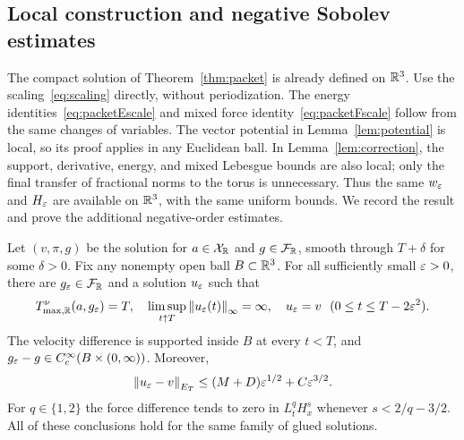 \subsection{Local construction and negative Sobolev estimates}
The compact solution of Theorem~\ref{thm:packet} is already defined on
$\mathbb R^3$. Use the scaling~\eqref{eq:scaling} directly, without
periodization. The energy identities~\eqref{eq:packetEscale} and mixed
force identity~\eqref{eq:packetFscale} follow from the same changes of
variables. The vector potential in Lemma~\ref{lem:potential} is local,
so its proof applies in any Euclidean ball. In
Lemma~\ref{lem:correction}, the support, derivative, energy, and mixed
Lebesgue bounds are also local; only the final transfer of fractional
norms to the torus is unnecessary. Thus the same $w_\varepsilon$ and $H_\varepsilon$
are available on $\mathbb R^3$, with the same uniform bounds. We record the
result and prove the additional negative-order estimates.
\begin{theorem}\label{thm:Rinsert}
Let $(v,\pi,g)$ be the solution for $a\in\mathcal X_{\mathbb R}$ and $g\in\mathcal F_{\mathbb R}$, smooth through $T+\delta$ for some $\delta>0$. Fix any nonempty open ball $B\subset\mathbb R^3$. For all sufficiently small $\varepsilon>0$, there are $g_\varepsilon\in\mathcal F_{\mathbb R}$ and a solution $u_\varepsilon$ such that
\[
 T^\nu_{\max,\mathbb R}(a,g_\varepsilon)=T,\quad
 \limsup_{t\uparrow T}\left\lVert u_\varepsilon(t)\right\rVert_\infty=\infty,\quad
 u_\varepsilon=v\ \ (0\le t\le T-2\varepsilon^2).
\]
The velocity difference is supported inside $B$ at every $t<T$, and $g_\varepsilon-g\in C_c^\infty(B\times(0,\infty))$. Moreover,
\begin{equation}\label{eq:REclose}
 \left\lVert u_\varepsilon-v\right\rVert_{E_T}\le(M+D)\varepsilon^{1/2}+C\varepsilon^{3/2}.
\end{equation}
For $q\in\{1,2\}$ the force difference tends to zero in $L^q_tH^s_x$ whenever $s<2/q-3/2$. All of these conclusions hold for the same family of glued solutions.
\end{theorem}
